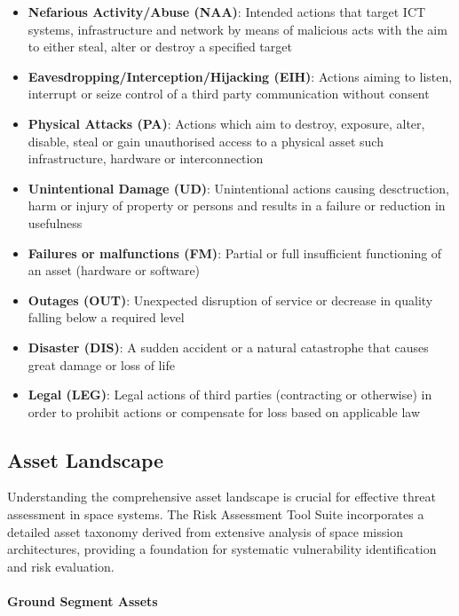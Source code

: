 \documentclass[binding=0.6cm]{sapthesis}
\begin{document}
\begin{itemize}
    \item \textbf{Nefarious Activity/Abuse (NAA)}: Intended actions that target ICT systems, infrastructure and network by means of malicious acts with the aim to either steal, alter or destroy a specified target
    \item \textbf{Eavesdropping/Interception/Hijacking (EIH)}: Actions aiming to listen, interrupt or seize control of a third party communication without consent
    \item \textbf{Physical Attacks (PA)}: Actions which aim to destroy, exposure, alter, disable, steal or gain unauthorised access to a physical asset such infrastructure, hardware or interconnection
    \item \textbf{Unintentional Damage (UD)}: Unintentional actions causing desctruction, harm or injury of property or persons and results in a failure or reduction in usefulness
    \item \textbf{Failures or malfunctions (FM)}: Partial or full insufficient functioning of an asset (hardware or software) 
    \item \textbf{Outages (OUT)}: Unexpected disruption of service or decrease in quality falling below a required level 
    \item \textbf{Disaster (DIS)}: A sudden accident or a natural catastrophe that causes great damage or loss of life
    \item \textbf{Legal (LEG)}: Legal actions of third parties (contracting or otherwise) in order to prohibit actions or compensate for loss based on applicable law
\end{itemize}


\subsection{Asset Landscape}

Understanding the comprehensive asset landscape is crucial for effective threat assessment in space systems. The Risk Assessment Tool Suite incorporates a detailed asset taxonomy derived from extensive analysis of space mission architectures, providing a foundation for systematic vulnerability identification and risk evaluation.

\paragraph{Ground Segment Assets}
\end{document}
